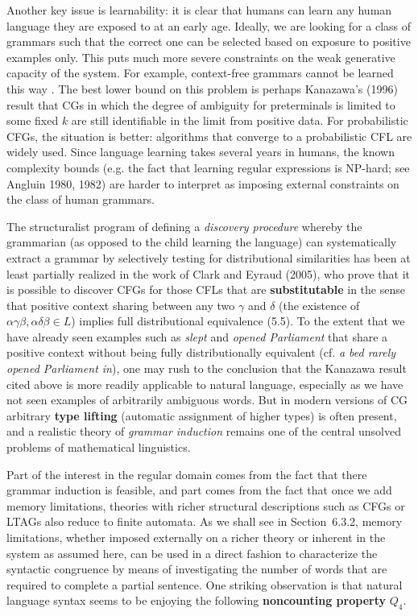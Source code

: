 Another key issue is learnability: it is clear that humans can learn any human
language they are exposed to at an early age. Ideally, we are looking for a
class of grammars such that the correct one can be selected based on exposure
to positive examples only. This puts much more severe constraints on the weak
generative capacity of the system. For example, context-free grammars cannot
be learned this way \cite{Gold:1967}. The best lower bound on this problem is
perhaps\nocite{Kanazawa:1996} Kanazawa's (1996) result that CGs in which the
degree of ambiguity for preterminals is limited to some fixed $k$ are still
identifiable in the limit from positive data. For probabilistic CFGs, the
situation is better: algorithms that converge to a probabilistic CFL are
widely used. Since language learning takes several years in humans, the known
complexity bounds (e.g.  the fact that learning regular expressions is NP-hard;
see\nocite{Angluin:1980}\nocite{Angluin:1982} Angluin 1980, 1982) are
harder to interpret as imposing external constraints on the class of human
grammars.

The structuralist program of defining a {\it discovery
  procedure} whereby the grammarian (as opposed to
the child learning the language) can systematically extract a grammar by
selectively testing for distributional similarities has been at least
partially realized in the work of \nocite{Clark:2005} Clark and Eyraud (2005),
who prove that it is possible to discover CFGs for those CFLs that are {\bf
  substitutable} in the sense that positive context sharing between any two
$\gamma$ and $\delta$ (the existence of $\alpha\gamma\beta, \alpha\delta\beta
\in L$) implies full distributional equivalence (5.5). To the extent that we
have already seen examples such as {\it slept} and {\it opened Parliament}
that share a positive context without being fully distributionally equivalent
(cf. {\it *a bed rarely opened Parliament in}), one may rush to the conclusion
that the Kanazawa result cited above is more readily applicable to natural
language, especially as we have not seen examples of arbitrarily ambiguous
words. But in modern versions of CG arbitrary {\bf type lifting} (automatic assignment of higher types) is often present, and a
realistic theory of {\sl grammar induction} remains one of the central
unsolved problems of mathematical linguistics.

Part of the interest in the regular domain comes from the fact that there
grammar induction is feasible, and part comes from the fact that once we add
memory limitations, theories with richer structural descriptions such as CFGs
or LTAGs also reduce to finite automata. As we shall see in Section~6.3.2,
memory limitations, whether imposed externally on a richer theory or inherent
in the system as assumed here, can be used in a direct fashion to characterize
the syntactic congruence by means of investigating the number of words that
are required to complete a partial sentence. One striking observation is that
natural language syntax seems to be enjoying the following {\bf noncounting
  property} $Q_4$.

